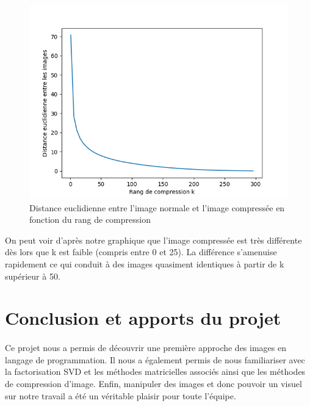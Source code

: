 \documentclass{article}
\begin{document}
\begin{figure}[h]
    \centering 
    \includegraphics{distance}
    \caption{Distance euclidienne entre l'image normale et l'image compressée en fonction du rang de compression}
    \label{distance}
\end{figure}

On peut voir d'après notre graphique  que l'image compressée est très différente dès lors que k est faible (compris entre 0 et 25). La différence s'amenuise rapidement ce qui conduit à des images quasiment identiques à partir de k supérieur à 50.

\section{Conclusion et apports du projet}
\paragraph{}

Ce projet nous a permis de découvrir une première approche des images en langage de programmation. Il nous a également permis de nous familiariser avec la factorisation SVD et les méthodes matricielles associés ainsi que les méthodes de compression d'image. Enfin, manipuler des images et donc pouvoir un visuel sur notre travail a été un véritable plaisir pour toute l'équipe. 
\end{document}
